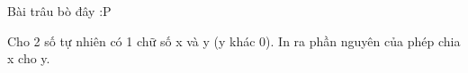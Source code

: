 Bài trâu bò đây :P  

   Cho 2 số tự nhiên có 1 chữ số x và y (y khác 0). In ra phần nguyên của phép chia x cho y.